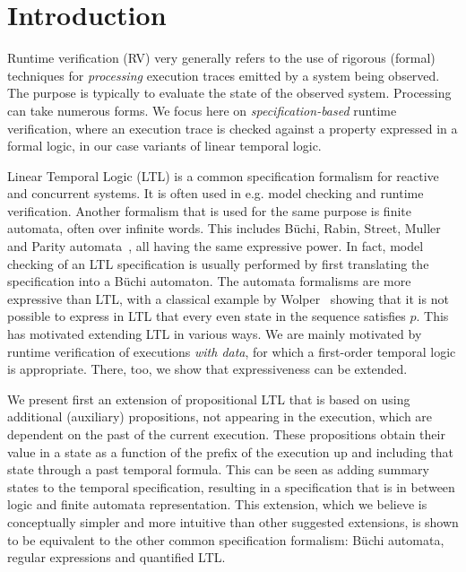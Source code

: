 \section{Introduction}

Runtime verification (RV)  \cite{bartocci18,havelund-rv-data-2018} very generally refers to the use of rigorous (formal) 
techniques for {\em processing} execution traces emitted by a system being observed. The purpose is typically
to evaluate the state of the observed system. Processing can take numerous
forms. We focus here on {\em specification-based} runtime verification, where an execution trace is checked against a property expressed in a formal logic, in our case variants of linear temporal logic.

Linear Temporal Logic (LTL) is a common specification formalism for reactive and concurrent systems. It is often used in e.g. model checking and runtime verification. Another formalism that is used for the same purpose is finite automata, often over infinite words. This includes B\"{u}chi, Rabin, Street, Muller and Parity automata~\cite{Thomas}, all having the same expressive power. In fact, model checking of an LTL specification
is usually performed by first translating the specification into a B\"{u}chi automaton. The automata formalisms are more expressive than LTL, with a classical example by Wolper~\cite{Wolper} showing that
it is not possible to express in LTL that every even state in
the sequence satisfies $p$. This has motivated extending LTL
in various ways.
We are mainly motivated by runtime verification of executions {\em with data}, for which a first-order temporal logic is
appropriate. There, too, we show that expressiveness can be extended.

We present first an extension of  propositional LTL that is based on using additional (auxiliary) propositions, not appearing in the execution, which are dependent on the past 
of the current execution. These propositions obtain their value in a state as a function of the prefix of the execution up and including that state through a past temporal formula. This can be seen as adding
summary states to the temporal specification, resulting in a specification that is in between logic and finite automata representation. This extension, which we believe is conceptually simpler
and more intuitive than other suggested extensions, is shown to be
equivalent to the other common specification formalism:
B\"{u}chi automata, regular expressions and quantified LTL.

